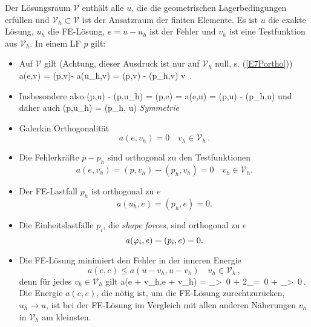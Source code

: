 Der L\"{o}sungsraum $\mathcal{V}$ enth\"{a}lt alle $u$, die die geometrischen Lagerbedingungen erf\"{u}llen und $\mathcal{V}_h \subset \mathcal{V}$ ist der Ansatzraum der finiten Elemente. Es ist $u$ die exakte L\"{o}sung, $u_h$ die FE-L\"{o}sung, $e = u - u_h$ ist der Fehler und $v_h$ ist eine Testfunktion aus $\mathcal{V}_h$. In einem LF $p$ gilt:\\

\begin{itemize}
\item Auf $\mathcal{V}$ gilt (Achtung, dieser Ausdruck ist nur auf $\mathcal{V}_h$ null, s. (\ref{E7Portho}))
\bfo\label{Theo199}
a(e,v) = (p,v)- a(u_h,v) = (p,v) - (p_h,v) \qquad v \in {}\,.
\efo
\item Insbesondere also
\bfo
(p,u) - (p,u_h) = (p,e) = a(e,u) = (p,u) - (p_h,u)
\efo
und daher auch
\bfo
(p,u_h) = (p_h, u) \qquad \mbox{{\em Symmetrie\/}}
\efo
\item Galerkin Orthogonalit\"{a}t
\begin{equation}
a(e, v_h)=0\quad  v_h\in \mathcal{V}_h \,.
\end{equation}
\item Die Fehlerkr\"{a}fte $p - p_h$ sind orthogonal zu den Testfunktionen
\begin{equation}\label{E7Portho}
a(e, v_h)= (p,v_h) - (p_h,v_h)=0\quad  v_h\in \mathcal{V}_h.
\end{equation}
\item Der FE-Lastfall $p_h$ ist orthogonal zu $e$
\begin{equation}
a( u_h,  e)= (p_h, e)=0.
\end{equation}
\item Die Einheitslastf\"{a}lle $p_i$, die {\em shape forces\/}, sind orthogonal zu $e$
\begin{equation}
a( \varphi_i,  e) = (p_i, e)=0.
\end{equation}
\item Die FE-L\"{o}sung minimiert den Fehler in der inneren Energie
\begin{equation}\label{E7Ungla}
a( e, e)\leq a( u-  v_h, u - v_h)\quad  v_h\in \mathcal{V}_h\,,
\end{equation}
denn f\"{u}r jedes $v_h \in \mathcal{V}_h$ gilt
\bfo\label{E7Proof1}
a(e + v_h,e + v_h) = _{>\, 0} + 2_{=\, 0} +
_{>\, 0}\,.
\efo
Die Energie $a(e,e)$, die n\"{o}tig ist, um die FE-L\"{o}sung \glq zurechtzur\"{u}cken\grq{}, $u_h \to u$, ist bei der FE-L\"{o}sung im Vergleich mit allen anderen N\"{a}herungen $v_h$ in $\mathcal{V}_h$ am kleinsten.

\end{itemize}
